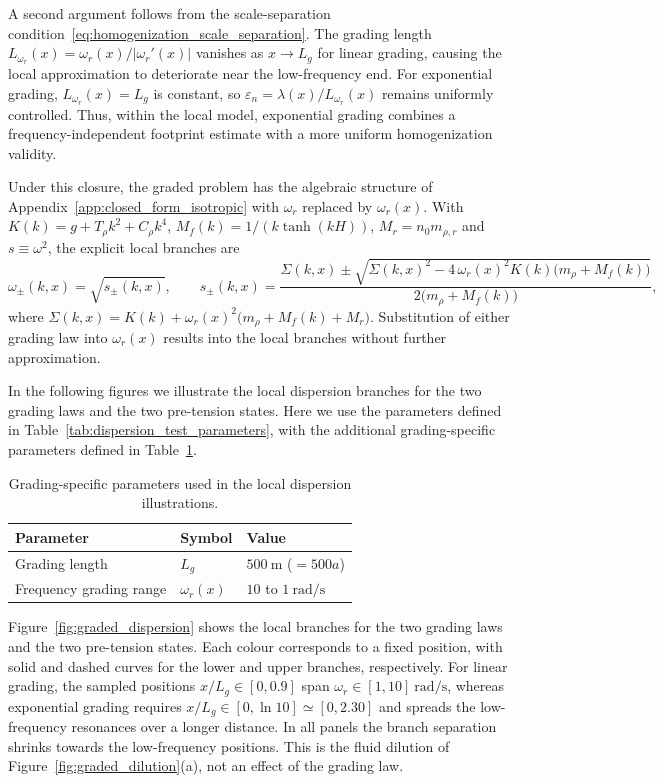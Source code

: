 A second argument follows from the scale-separation condition~\eqref{eq:homogenization_scale_separation}. The grading length $L_{\omega_r}(x)=\omega_r(x)/|\omega_r'(x)|$ vanishes as $x\to L_g$ for linear grading, causing the local approximation to deteriorate near the low-frequency end. For exponential grading, $L_{\omega_r}(x)=L_g$ is constant, so $\varepsilon_n=\lambda(x)/L_{\omega_r}(x)$ remains uniformly controlled. Thus, within the local model, exponential grading combines a frequency-independent footprint estimate with a more uniform homogenization validity.


Under this closure, the graded problem has the algebraic structure of Appendix~\ref{app:closed_form_isotropic} with $\omega_r$ replaced by $\omega_r(x)$. With $K(k)=g+T_\rho k^2+C_\rho k^4$, $M_f(k)=1/(k\tanh(kH))$, $M_r=n_0m_{\rho,r}$ and $s\equiv\omega^2$, the explicit local branches are
\begin{equation}\label{eq:omega_k_x_closed_form}
    \omega_\pm(k,x) = \sqrt{s_\pm(k,x)},
    \qquad
    s_\pm(k,x)=\frac{\Sigma(k,x)\pm\sqrt{\Sigma(k,x)^2-4\,\omega_r(x)^2K(k)\big(m_\rho+M_f(k)\big)}}{2\big(m_\rho+M_f(k)\big)},
\end{equation}
where $\Sigma(k,x)=K(k)+\omega_r(x)^2\big(m_\rho+M_f(k)+M_r\big)$. Substitution of either grading law into $\omega_r(x)$ results into the local branches without further approximation.

In the following figures we illustrate the local dispersion branches for the two grading laws and the two pre-tension states. Here we use the parameters defined in Table~\ref{tab:dispersion_test_parameters}, with the additional grading-specific parameters defined in Table~\ref{tab:grading_parameters}.

\begin{table}[htbp]
\caption{Grading-specific parameters used in the local dispersion illustrations.}
\label{tab:grading_parameters}
\centering
\begin{tabular}{lll}
    \hline
    Parameter & Symbol & Value \\
    \hline
    Grading length & $L_g$ & $500\ \si{\meter}$ ($=500a$) \\
    Frequency grading range & $\omega_r(x)$ & $10$ to $1\ \si{\radian\per\second}$ \\
    \hline
\end{tabular}
\end{table}

Figure~\ref{fig:graded_dispersion} shows the local branches for the two grading laws and the two pre-tension states. Each colour corresponds to a fixed position, with solid and dashed curves for the lower and upper branches, respectively. For linear grading, the sampled positions $x/L_g\in[0,0.9]$ span $\omega_r\in[1,10]~\si{\radian\per\second}$, whereas exponential grading requires $x/L_g\in[0,\ln10]\simeq[0,2.30]$ and spreads the low-frequency resonances over a longer distance. In all panels the branch separation shrinks towards the low-frequency positions. This is the fluid dilution of Figure~\ref{fig:graded_dilution}(a), not an effect of the grading law.

